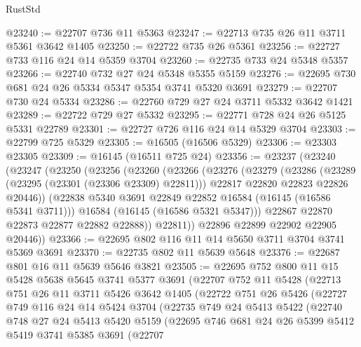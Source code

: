 \begin{lexlean}{RustStd}
\begin{coremodule}
@23240 := @22707 @736 @11 @5363
@23247 := @22713 @735 @26 @11 @3711 @5361 @3642 @1405
@23250 := @22722 @735 @26 @5361
@23256 := @22727 @733 @116 @24 @14 @5359 @3704
@23260 := @22735 @733 @24 @5348 @5357
@23266 := @22740 @732 @27 @24 @5348 @5355 @5159
@23276 := @22695 @730 @681 @24 @26 @5334 @5347 @5354 @3741 @5320 @3691
@23279 := @22707 @730 @24 @5334
@23286 := @22760 @729 @27 @24 @3711 @5332 @3642 @1421
@23289 := @22722 @729 @27 @5332
@23295 := @22771 @728 @24 @26 @5125 @5331 @22789
@23301 := @22727 @726 @116 @24 @14 @5329 @3704
@23303 := @22799 @725 @5329
@23305 := @16505 (@16506 @5329)
@23306 := @23303 @23305
@23309 := @16145 (@16511 @725 @24)
@23356 := @23237
    (@23240
      (@23247
        (@23250
          (@23256
            (@23260
              (@23266
                (@23276
                  (@23279
                    (@23286
                      (@23289 (@23295 (@23301 (@23306 @23309) @22811)))
                      @22817
                      @22820
                      @22823
                      @22826
                      @20446))
                  (@22838 @5340 @3691 @22849 @22852 @16584 (@16145 (@16586 @5341 @3711)))
                  @16584
                  (@16145 (@16586 @5321 @5347)))
                @22867
                @22870
                @22873
                @22877
                @22882
                @22888))
            @22811))
        @22896
        @22899
        @22902
        @22905
        @20446))
@23366 := @22695 @802 @116 @11 @14 @5650 @3711 @3704 @3741 @5369 @3691
@23370 := @22735 @802 @11 @5639 @5648
@23376 := @22687 @801 @16 @11 @5639 @5646 @3821
@23505 := @22695
    @752
    @800
    @11
    @15
    @5428
    @5638
    @5645
    @3741
    @5377
    @3691
    (@22707
      @752
      @11
      @5428
      (@22713
        @751
        @26
        @11
        @3711
        @5426
        @3642
        @1405
        (@22722
          @751
          @26
          @5426
          (@22727
            @749
            @116
            @24
            @14
            @5424
            @3704
            (@22735
              @749
              @24
              @5413
              @5422
              (@22740
                @748
                @27
                @24
                @5413
                @5420
                @5159
                (@22695
                  @746
                  @681
                  @24
                  @26
                  @5399
                  @5412
                  @5419
                  @3741
                  @5385
                  @3691
                  (@22707

\end{coremodule}
\end{lexlean}
